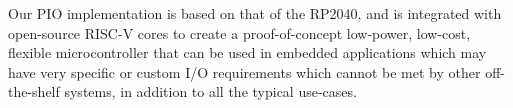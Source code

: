 Our PIO implementation is based on that of the RP2040, and is integrated with open-source RISC-V cores to create a proof-of-concept low-power, low-cost, flexible microcontroller that can be used in embedded applications which may have very specific or custom I/O requirements which cannot be met by other off-the-shelf systems, in addition to all the typical use-cases.